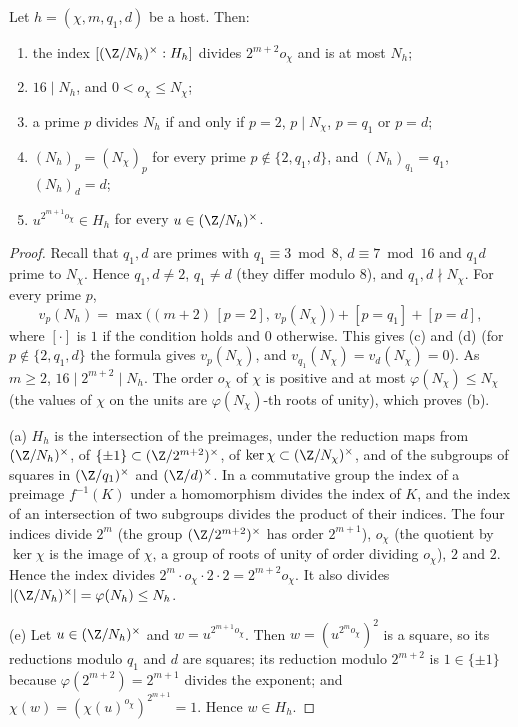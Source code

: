 \begin{lemma}\label{pf:sh-misc:hostindex}
Let $h=(\chi,m,q_1,d)$ be a host. Then:
\begin{enumerate}[label=(\alph*)]
\item the index $[(\Z/N_h)^\times:H_h]$ divides $2^{m+2}o_\chi$ and is at most $N_h$;
\item $16\mid N_h$, and $0<o_\chi\le N_\chi$;
\item a prime $p$ divides $N_h$ if and only if $p=2$, $p\mid N_\chi$, $p=q_1$ or $p=d$;
\item $(N_h)_p=(N_\chi)_p$ for every prime $p\notin\{2,q_1,d\}$, and $(N_h)_{q_1}=q_1$, $(N_h)_d=d$;
\item $u^{2^{m+1}o_\chi}\in H_h$ for every $u\in(\Z/N_h)^\times$.
\end{enumerate}
\end{lemma}

\begin{proof}
Recall that $q_1,d$ are primes with $q_1\equiv3\bmod8$, $d\equiv7\bmod16$ and $q_1d$ prime to $N_\chi$. Hence $q_1,d\ne2$, $q_1\ne d$
(they differ modulo $8$), and $q_1,d\nmid N_\chi$. For every prime $p$,
\[
v_p(N_h)=\max\bigl((m+2)\,[p=2],\,v_p(N_\chi)\bigr)+[p=q_1]+[p=d],
\]
where $[\cdot]$ is $1$ if the condition holds and $0$ otherwise. This gives (c) and (d) (for $p\notin\{2,q_1,d\}$ the formula gives
$v_p(N_\chi)$, and $v_{q_1}(N_\chi)=v_d(N_\chi)=0$). As $m\ge2$, $16\mid2^{m+2}\mid N_h$. The order $o_\chi$ of $\chi$ is positive and at most
$\varphi(N_\chi)\le N_\chi$ (the values of $\chi$ on the units are $\varphi(N_\chi)$-th roots of unity), which proves (b).

(a) $H_h$ is the intersection of the preimages, under the reduction maps from $(\Z/N_h)^\times$, of $\{\pm1\}\subset(\Z/2^{m+2})^\times$, of
$\ker\chi\subset(\Z/N_\chi)^\times$, and of the subgroups of squares in $(\Z/q_1)^\times$ and $(\Z/d)^\times$. In a commutative group the index
of a preimage $f^{-1}(K)$ under a homomorphism divides the index of $K$, and the index of an intersection of two subgroups divides the
product of their indices. The four indices divide $2^m$ (the group $(\Z/2^{m+2})^\times$ has order $2^{m+1}$), $o_\chi$ (the quotient by
$\ker\chi$ is the image of $\chi$, a group of roots of unity of order dividing $o_\chi$), $2$ and $2$. Hence the index divides
$2^m\cdot o_\chi\cdot2\cdot2=2^{m+2}o_\chi$. It also divides $|(\Z/N_h)^\times|=\varphi(N_h)\le N_h$.

(e) Let $u\in(\Z/N_h)^\times$ and $w=u^{2^{m+1}o_\chi}$. Then $w=(u^{2^mo_\chi})^2$ is a square, so its reductions modulo $q_1$ and $d$ are
squares; its reduction modulo $2^{m+2}$ is $1\in\{\pm1\}$ because $\varphi(2^{m+2})=2^{m+1}$ divides the exponent; and
$\chi(w)=(\chi(u)^{o_\chi})^{2^{m+1}}=1$. Hence $w\in H_h$.
\end{proof}

